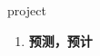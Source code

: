 
\begin{frame}
{\huge project}
\begin{center}
\begin{enumerate}\Large
  \item \textbf{预测，预计}
\end{enumerate}
\end{center}
\end{frame}
